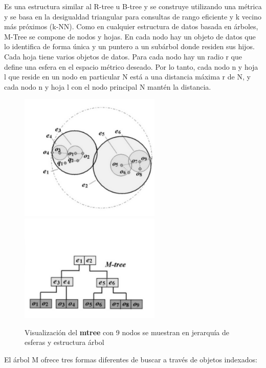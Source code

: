 \documentclass[a4paper]{article}
\begin{document}
Es una estructura similar al R-tree u B-tree y se construye utilizando una métrica y se basa en la desigualdad triangular
para consultas de rango eficiente y k vecino más próximos (k-NN). Como en cualquier estructura de datos basada en árboles,
M-Tree se compone de nodos y hojas. En cada nodo hay un objeto de datos que lo identifica de forma única y un puntero a
un subárbol donde residen sus hijos. Cada hoja tiene varios objetos de datos. Para cada nodo hay un radio r que define una
esfera en el espacio métrico deseado. Por lo tanto, cada nodo n y hoja l que reside en un nodo en particular N está a una
distancia máxima r de N, y cada nodo n y hoja l con el nodo principal N mantén la distancia\cite{Ciaccia97m-tree:an}\cite{Ciaccia1997IndexingMS}.
\begin{figure}[H]
  \centering
  \includegraphics[width=0.6\textwidth]{imagenes/Captura de pantalla de 2021-12-16 00-34-09.png}
   \includegraphics[width=0.6\textwidth]{imagenes/Captura de pantalla de 2021-12-16 00-33-54.png}
  \caption{Visualización del \textbf{mtree} con 9 nodos se muestran en jerarquía de esferas y estructura árbol}
\end{figure}
El árbol M ofrece tres formas diferentes de buscar a través de objetos indexados:
\end{document}
